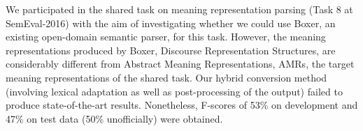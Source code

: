 We participated in the shared task on meaning representation parsing (Task 8 at SemEval-2016) with the aim of investigating whether we could use Boxer, an existing open-domain semantic parser, for this task. However, the meaning representations produced by Boxer, Discourse Representation Structures, are considerably different from Abstract Meaning Representations, AMRs, the target meaning representations of the shared task. Our hybrid conversion method (involving lexical adaptation as well as post-processing of the output) failed to produce state-of-the-art results. Nonetheless, F-scores of 53\% on development and 47\% on test data (50\% unofficially) were obtained.

